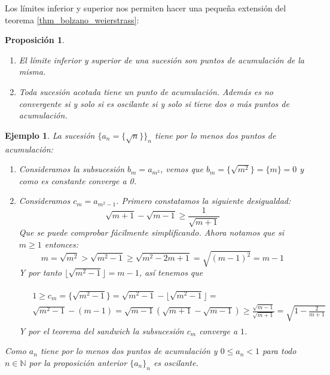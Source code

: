 \documentclass{article}
\newtheorem{prop}{Proposición}
\newtheorem{ejem}{Ejemplo}
\newcommand{\naturales}{\mathbb{N}}
\newcommand{\sucesion}[1]{\{ #1 _n \}_n}
\begin{document}
Los límites inferior y superior nos permiten hacer una pequeña extensión del teorema \eqref{thm_bolzano_weierstrass}:
\begin{prop}
\begin{enumerate}
\item
	El límite inferior y superior de una sucesión son puntos de acumulación de la misma.
\item
	Toda sucesión acotada tiene un punto de acumulación. Además es no convergente si y solo si es oscilante si y solo si tiene dos o más puntos de acumulación.
\end{enumerate}
\end{prop}


\begin{ejem}
	La sucesión $\{ a_n = \{\sqrt{n}\} \}_n$ tiene por lo menos dos puntos de acumulación:
	\begin{enumerate}
		\item
		Consideramos la subsucesión $b_m = a_{m^2}$, vemos que $b_m = \{\sqrt{m^2} \} = \{m \} = 0$ y como es constante converge a 0.
		\item
		Consideramos $c_m = a_{m^2 - 1}$. Primero constatamos la siguiente desigualdad:
		\begin{equation}
			\sqrt{m+1} - \sqrt{m-1} \geq \frac{1}{\sqrt{m+1}}
		\end{equation}				
		Que se puede comprobar fácilmente simplificando. Ahora notamos que si $m \geq 1$ entonces:
		\begin{equation*}
			m = \sqrt{m^2} > \sqrt{m^2 - 1} \geq \sqrt{m^2 - 2m + 1} = \sqrt{(m-1)^2} = m - 1
		\end{equation*}
		Y por tanto $\lfloor \sqrt{m^2 - 1} \rfloor = m - 1$, así tenemos que 
		
		\begin{align*}
			\begin{split}
				& 1 \geq c_m = \{\sqrt{m^2 - 1} \} = \sqrt{m^2 - 1} - \lfloor \sqrt{m^2 - 1} \rfloor =\\ & \sqrt{m^2 - 1} - (m - 1) = \sqrt{m-1}(\sqrt{m+1} - \sqrt{m-1})
				\geq  \frac{\sqrt{m-1}}{\sqrt{m+1}} = \sqrt{1 - \frac{2}{m+1}}
			\end{split}
		\end{align*}
		Y por el teorema del sandwich la subsucesión $c_m$ converge a $1$.\
	\end{enumerate}
	Como $a_n$ tiene por lo menos dos puntos de acumulación y $0 \leq a_n < 1$ para todo $n \in \naturales$ por la proposición anterior $\sucesion{a}$ es oscilante.
\end{ejem}
\end{document}
